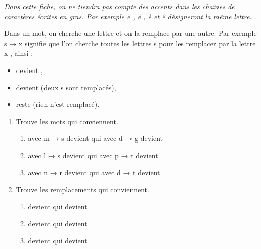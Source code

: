 \documentclass[class=report,crop=false, 12pt]{standalone}
\begin{document}

\emph{Dans cette fiche, on ne tiendra pas compte des accents dans les chaînes de caractères écrites en gras. Par exemple \og e \fg{}, \og é \fg{}, \og è \fg{} et \og ê \fg{} désigneront la même lettre.}

\bigskip
\bigskip

\begin{activite}

Dans un mot, on cherche une lettre et on la remplace par une autre. Par exemple \og s → x \fg{} signifie que l'on cherche toutes les lettres \og s \fg{} pour les remplacer par la lettre \og x \fg{}, ainsi :
  
\begin{itemize}
  \item {} devient ,
  \item {} devient  (deux \og s \fg{} sont remplacés),
  \item {} reste  (rien n'est remplacé).
\end{itemize}

\begin{enumerate}
  \item Trouve les mots qui conviennent.

  \begin{enumerate}
    \item {} avec  \og m → s \fg{} devient  qui avec \og d → g \fg{} devient 
    \item {} avec \og l → s \fg{} devient  qui avec \og p → t \fg{} devient 
    \item {} avec \og n → r \fg{} devient  qui avec \og d → t \fg{} devient  
  \end{enumerate}  
  
  \item Trouve les remplacements qui conviennent.
  \begin{enumerate}
    \item {} devient  qui devient 
    \item {} devient  qui devient 
    \item {} devient  qui devient 
  \end{enumerate}  
  
\end{enumerate}

\end{activite}
\end{document}
